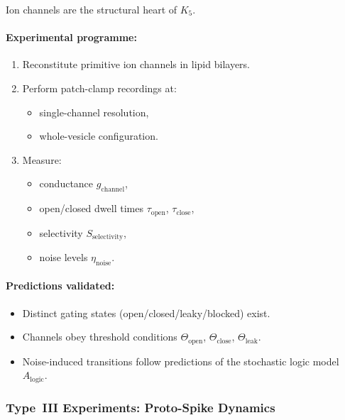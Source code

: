 Ion channels are the structural heart of $K_5$.

\paragraph{Experimental programme:}

\begin{enumerate}
    \item Reconstitute primitive ion channels in lipid bilayers.
    \item Perform patch-clamp recordings at:
          \begin{itemize}
              \item single-channel resolution,
              \item whole-vesicle configuration.
          \end{itemize}
    \item Measure:
          \begin{itemize}
              \item conductance $g_{\mathrm{channel}}$,
              \item open/closed dwell times $\tau_{\mathrm{open}}$, $\tau_{\mathrm{close}}$,
              \item selectivity $S_{\mathrm{selectivity}}$,
              \item noise levels $\eta_{\mathrm{noise}}$.
          \end{itemize}
\end{enumerate}

\paragraph{Predictions validated:}

\begin{itemize}
    \item Distinct gating states (open/closed/leaky/blocked) exist.
    \item Channels obey threshold conditions 
          $\Theta_{\mathrm{open}}$, $\Theta_{\mathrm{close}}$, $\Theta_{\mathrm{leak}}$.
    \item Noise-induced transitions follow predictions of the 
          stochastic logic model $A_{\mathrm{logic}}$.
\end{itemize}



\subsubsection{Type~III Experiments: Proto-Spike Dynamics}

